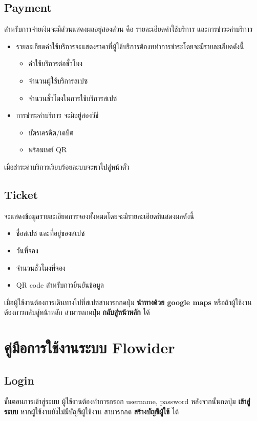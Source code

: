 \section{Payment}
สำหรับการจ่ายเงินจะมีส่วนแสดงผลอยู่สองส่วน คือ รายละเอียดค่าใช้บริการ และการชำระค่าบริการ
\begin{itemize}
    \item รายละเอียดค่าใช้บริการจะแสดงราคาที่ผู้ใช้บริการต้องททำการชำระโดยจะมีรายละเอียดดังนี้
    \begin{itemize}
        \item ค่าใช้บริการต่อชั่วโมง
        \item จำนวนผู้ใช้บริการสเปซ
        \item จำนวนชั่วโมงในการใช้บริการสเปซ        
    \end{itemize}
    \item การชำระค่าบริการ จะมีอยู่สองวิธี
    \begin{itemize}
        \item บัตรเครดิต/เดบิต
        \item พร้อมเพย์ QR        
    \end{itemize}
\end{itemize}
เมื่อชำระค่าบริการเรียบร้อยละบบจะพาไปสู่หน้าตั๋ว

\section{Ticket}
จะแสดงข้อมูลรายละเอียดการจองทั้งหมดโดยจะมีรายละเอียดที่แสดงผลดังนี้
\begin{itemize}
    \item ชื่อสเปซ และที่อยู่ของสเปซ
    \item วันที่จอง
    \item จำนวนชั่วโมงที่จอง
    \item QR code สำหรับการยืนยันข้อมูล
\end{itemize}
เมื่อผู้ใช้งานต้องการเดินทางไปที่สเปซสามารถกดปุ่ม \textbf{นำทางด้วย google maps} หรือถ้าผู้ใช้งานต้องการกลับสู่หน้าหลัก สามารถกดปุ่ม \textbf{กลับสู่หน้าหลัก} ได้

\chapter{คู่มือการใช้งานระบบ Flowider}

\section{Login}
ขั้นตอนการเข้าสู่ระบบ ผู้ใช้งานต้องทำการกรอก username, password หลังจากนั้นกดปุ่ม \textbf{เข้าสู่ระบบ} หากผู้ใช้งานยังไม่มีบัญชีผู้ใช้งาน สามารถกด \textbf{สร้างบัญชีผู้ใช้} ได้

